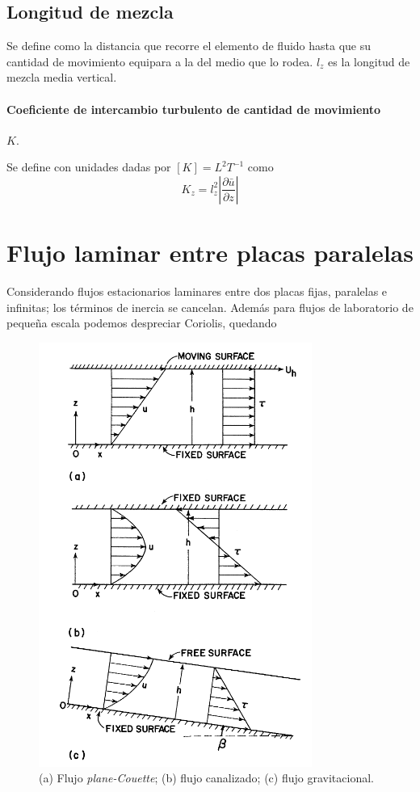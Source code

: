 \documentclass[openany]{book}
\begin{document}
\subsection{Longitud de mezcla}
Se define como la distancia que recorre el elemento de fluido hasta que
su cantidad de movimiento equipara a la del medio que lo rodea. $l_z$
es la longitud de mezcla media vertical.

\paragraph{Coeficiente de intercambio turbulento de cantidad de movimiento}
$K$.
\par Se define con unidades dadas por $[K]=L^{2}T^{-1}$ como 
\begin{equation}
    K_{z}=l_{z}^{2}\left|\frac{\partial \bar{u}}{\partial z}\right|
\end{equation}

\section{Flujo laminar entre placas paralelas}
Considerando flujos estacionarios laminares entre dos placas
fijas, paralelas e infinitas; los términos de inercia se cancelan. Además 
para flujos de laboratorio de pequeña escala podemos despreciar
Coriolis, quedando

\begin{figure}[htb]
    \centering
    \includegraphics[width=0.6\linewidth]{img/laminar-fluxes.png}
    \caption{(a) Flujo \emph{plane-Couette}; (b) flujo canalizado;
    (c) flujo gravitacional.}
    \label{fig:laminar-flows}
\end{figure}
\end{document}
